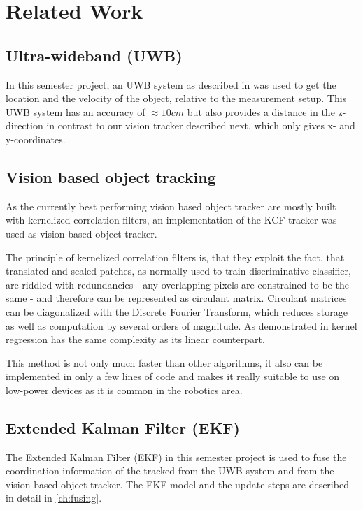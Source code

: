 
\setcounter{chapter}{1}

\chapter{Related Work}

\section{Ultra-wideband (UWB)}
In this semester project, an UWB system as described in   was used to get the location and the velocity of the object, relative to the measurement setup. This UWB system has an accuracy of $\approx 10 cm$ but also provides a distance in the z-direction in contrast to our vision tracker described next, which only gives x- and y-coordinates. 

\section{Vision based object tracking}
As the currently best performing vision based object tracker are mostly built with kernelized correlation filters, an implementation of the KCF tracker \cite{henriques2015tracking} was used as vision based object tracker.

The principle of kernelized correlation filters is, that they exploit the fact, that translated and scaled patches, as normally used to train discriminative classifier, are riddled with redundancies - any overlapping pixels are constrained to be the same - and therefore can be represented as circulant matrix. Circulant matrices can be diagonalized with the Discrete Fourier Transform, which reduces storage as well as computation by several orders of magnitude. As demonstrated in \cite{henriques2015tracking} kernel regression has the same complexity as its linear counterpart.

This method is not only much faster than other algorithms, it also can be implemented in only a few lines of code and makes it really suitable to use on low-power devices as it is common in the robotics area.

\section{Extended Kalman Filter (EKF)}
The Extended Kalman Filter (EKF)  in this semester project is used to fuse the coordination information of the tracked from the UWB system and from the vision based object tracker. The EKF model and the update steps are described in detail in \autoref{ch:fusing}.